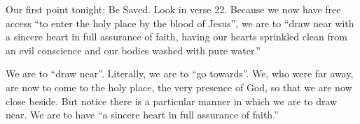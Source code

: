 \documentclass[letterpaper, 12pt]{article}
\begin{document}
    Our first point tonight: Be Saved. Look in verse 22. Because we now
    have free access ``to enter the holy place by the blood of Jesus'',
    we are to ``draw near with a sincere heart in full assurance of
    faith, having our hearts sprinkled clean from an evil conscience and
    our bodies washed with pure water.''

    We are to ``draw near''. Literally, we are to ``go towards''. We,
    who were far away, are now to come to the holy place, the very
    presence of God, so that we are now close beside. But notice there
    is a particular manner in which we are to draw near. We are to have
    ``a sincere heart in full assurance of faith.'' 
\end{document}
